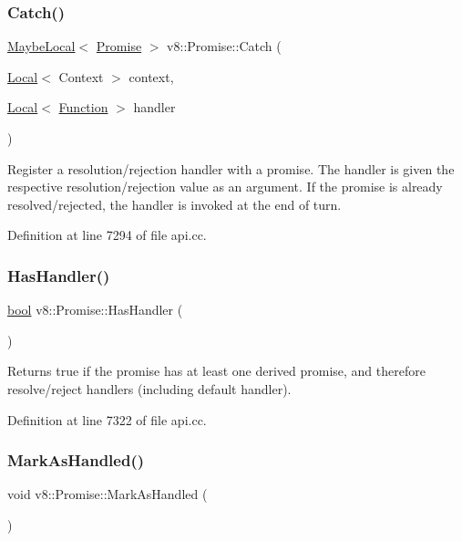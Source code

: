 \subsubsection{\texorpdfstring{Catch()}{Catch()}}
{\footnotesize\ttfamily \mbox{\hyperlink{classv8_1_1MaybeLocal}{Maybe\+Local}}$<$ \mbox{\hyperlink{classv8_1_1Promise}{Promise}} $>$ v8\+::\+Promise\+::\+Catch (\begin{DoxyParamCaption}\item[{\mbox{\hyperlink{classv8_1_1Local}{Local}}$<$ Context $>$}]{context,  }\item[{\mbox{\hyperlink{classv8_1_1Local}{Local}}$<$ \mbox{\hyperlink{classv8_1_1Function}{Function}} $>$}]{handler }\end{DoxyParamCaption})}

Register a resolution/rejection handler with a promise. The handler is given the respective resolution/rejection value as an argument. If the promise is already resolved/rejected, the handler is invoked at the end of turn. 

Definition at line 7294 of file api.\+cc.

\mbox{\label{classv8_1_1Promise_aeea8bdfdbe2291632d7f0d45394c1722}} 
\subsubsection{\texorpdfstring{Has\+Handler()}{HasHandler()}}
{\footnotesize\ttfamily \mbox{\hyperlink{classbool}{bool}} v8\+::\+Promise\+::\+Has\+Handler (\begin{DoxyParamCaption}{ }\end{DoxyParamCaption})}

Returns true if the promise has at least one derived promise, and therefore resolve/reject handlers (including default handler). 

Definition at line 7322 of file api.\+cc.

\mbox{\label{classv8_1_1Promise_a17d6e3484dc051e1c05a31fd285b0f9f}} 
\subsubsection{\texorpdfstring{Mark\+As\+Handled()}{MarkAsHandled()}}
{\footnotesize\ttfamily void v8\+::\+Promise\+::\+Mark\+As\+Handled (\begin{DoxyParamCaption}{ }\end{DoxyParamCaption})}


